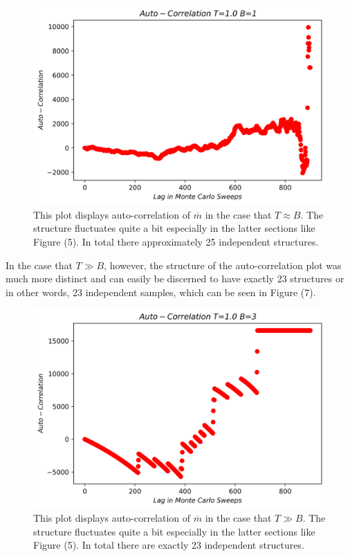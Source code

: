 \documentclass[twocolumn]{article}
\begin{document}
\begin{figure}[h]
\caption{This plot displays auto-correlation of $\overline{m}$ in the case that $T \approx B$. The structure fluctuates quite a bit especially in the latter sections like Figure (5). In total there approximately 25 independent structures.}
\centering
\includegraphics[scale=.5]{AutocorrelationT=1B=1Scatter}
\end{figure} 
\hspace{-3.8mm}In the case that $T \gg B$, however, the structure of the auto-correlation plot was much more distinct and can easily be discerned to have exactly 23 structures or in other words, 23 independent samples, which can be seen in Figure (7).\\
\begin{figure}[H]
\caption{This plot displays auto-correlation of $\overline{m}$ in the case that $T \gg B$. The structure fluctuates quite a bit especially in the latter sections like Figure (5). In total there are exactly 23 independent structures.}
\centering
\includegraphics[scale=.5]{AutocorrelationT=1B=3Scatter}
\end{figure}
\end{document}
